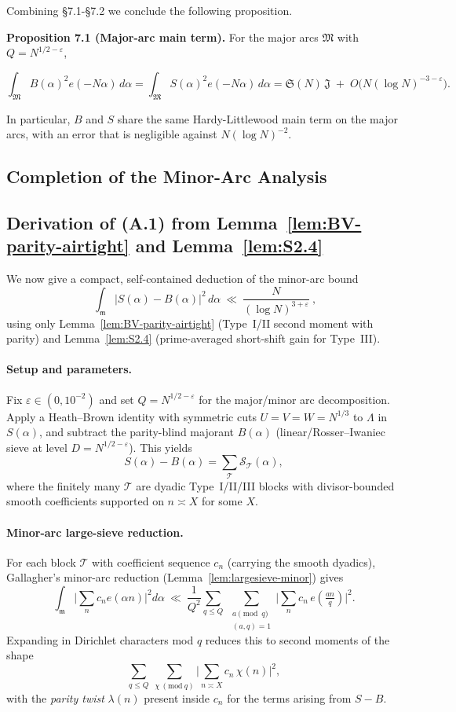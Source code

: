 \documentclass[11pt]{article}
\theoremstyle{definition}
\theoremstyle{remark}
\numberwithin{equation}{part}
\begin{document}
Combining §7.1-§7.2 we conclude the following proposition.

\noindent\textbf{Proposition 7.1 (Major-arc main term).} For the major arcs $\mathfrak M$ with $Q=N^{1/2-\varepsilon}$,

$$
	\int_{\mathfrak M} B(\alpha)^2 e(-N\alpha)\,d\alpha
	=\int_{\mathfrak M} S(\alpha)^2 e(-N\alpha)\,d\alpha
	=\mathfrak S(N)\,\mathfrak J\;+\;O\!\big(N(\log N)^{-3-\varepsilon}\big).
$$

In particular, $B$ and $S$ share the same Hardy-Littlewood main term on the major arcs, with an error that is negligible against $N(\log N)^{-2}$.

\subsection*{Completion of the Minor-Arc Analysis}

\subsection*{Derivation of \texorpdfstring{(A.1)}{(A.1)} from Lemma~\ref{lem:BV-parity-airtight} and Lemma~\ref{lem:S2.4}}

We now give a compact, self-contained deduction of the minor-arc bound
\[
	\boxed{\ \ \int_{\mathfrak m}\!\bigl|S(\alpha)-B(\alpha)\bigr|^{2}\,d\alpha
		\ \ll\ \frac{N}{(\log N)^{3+\varepsilon}}\ ,\ }
	\tag{A.1}
\]
using only Lemma~\ref{lem:BV-parity-airtight} (Type~I/II second moment with parity) and Lemma~\ref{lem:S2.4} (prime-averaged short-shift gain for Type~III).

\paragraph{Setup and parameters.}
Fix $\varepsilon\in(0,10^{-2})$ and set $Q=N^{1/2-\varepsilon}$ for the major/minor arc decomposition.
Apply a Heath–Brown identity with symmetric cuts $U=V=W=N^{1/3}$ to $\Lambda$ in $S(\alpha)$, and subtract the parity-blind majorant $B(\alpha)$ (linear/Rosser–Iwaniec sieve at level $D=N^{1/2-\varepsilon}$).
This yields
\[
	S(\alpha)-B(\alpha)=\sum_{\mathcal T}\mathcal S_{\mathcal T}(\alpha),
\]
where the finitely many $\mathcal T$ are dyadic Type~I/II/III blocks with divisor-bounded smooth coefficients supported on $n\asymp X$ for some $X$.

\paragraph{Minor-arc large-sieve reduction.}
For each block $\mathcal T$ with coefficient sequence $c_n$ (carrying the smooth dyadics), Gallagher’s minor-arc reduction (Lemma~\ref{lem:largesieve-minor}) gives
\[
	\int_{\mathfrak m}\Big|\sum_n c_n e(\alpha n)\Big|^2 d\alpha
	\ \ll\ \frac{1}{Q^2}\sum_{q\le Q}\ \sum_{\substack{a\!\!\!\!\pmod q\\(a,q)=1}}
	\Big|\sum_n c_n\,e\!\left(\tfrac{an}{q}\right)\Big|^2.
\]
Expanding in Dirichlet characters mod $q$ reduces this to second moments of the shape
\[
	\sum_{q\le Q}\ \sum_{\chi\ (\mathrm{mod}\ q)}
	\Big|\sum_{n\asymp X} c_n\,\chi(n)\Big|^2,
\]
with the \emph{parity twist} $\lambda(n)$ present inside $c_n$ for the terms arising from $S-B$.
\end{document}
